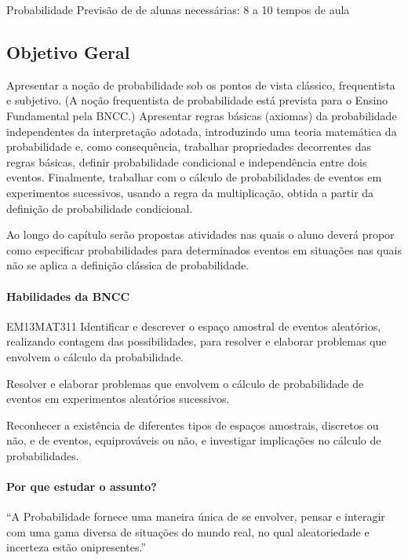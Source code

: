 \begin{apresentacao}{Probabilidade}
Previsão de de alunas necessárias: 8 a 10 tempos de aula

\subsection{Objetivo Geral}
Apresentar a noção de probabilidade sob os pontos de vista clássico, frequentista e subjetivo. (A noção frequentista de probabilidade está prevista para o Ensino Fundamental pela BNCC.) Apresentar regras básicas (axiomas) da probabilidade independentes da interpretação adotada, introduzindo uma teoria matemática da probabilidade e, como consequência, trabalhar propriedades decorrentes das regras básicas, definir probabilidade condicional e independência entre dois eventos. Finalmente, trabalhar com o cálculo de probabilidades de eventos em experimentos sucessivos, usando a regra da multiplicação, obtida a partir da definição de probabilidade condicional.

Ao longo do capítulo serão propostas atividades nas quais o aluno deverá propor como especificar probabilidades para determinados eventos em situações nas quais não se aplica a definição clássica de probabilidade.

\paragraph{Habilidades da BNCC}
\begin{habilities}{EM13MAT311}
Identificar e descrever o espaço amostral de eventos aleatórios, realizando contagem das possibilidades, para resolver e elaborar problemas que envolvem o cálculo da probabilidade.
\columnbreak

Resolver e elaborar problemas que envolvem o cálculo de probabilidade de eventos em experimentos aleatórios sucessivos.

Reconhecer a existência de diferentes tipos de espaços amostrais, discretos ou não, e de eventos, equiprováveis ou não, e investigar implicações no cálculo de probabilidades.
\end{habilities}

\paragraph{Por que estudar o assunto?}
“A Probabilidade fornece uma maneira única de se envolver, pensar e interagir com uma gama diversa de situações do mundo real, no qual aleatoriedade e incerteza estão onipresentes.”{} \citep{budgett2016}


\end{apresentacao}
